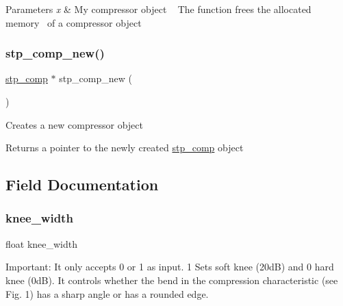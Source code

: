 \begin{DoxyParams}{Parameters}
{\em x} & My compressor object ~\newline
 The function frees the allocated memory~\newline
 of a compressor object \\
\hline
\end{DoxyParams}
\mbox{\label{structstp__comp_adcecb43a5505c7a62ff01747b89cba1c}} 
\subsubsection{\texorpdfstring{stp\+\_\+comp\+\_\+new()}{stp\_comp\_new()}}
{\footnotesize\ttfamily \mbox{\hyperlink{structstp__comp}{stp\+\_\+comp}} $\ast$ stp\+\_\+comp\+\_\+new (\begin{DoxyParamCaption}{ }\end{DoxyParamCaption})\hspace{0.3cm}{\ttfamily [related]}}



Creates a new compressor object~\newline
 

\begin{DoxyReturn}{Returns}
a pointer to the newly created \mbox{\hyperlink{structstp__comp}{stp\+\_\+comp}} object ~\newline
 
\end{DoxyReturn}


\subsection{Field Documentation}
\mbox{\label{structstp__comp_a177e7480fe81136c83715e274f5600d9}} 
\subsubsection{\texorpdfstring{knee\+\_\+width}{knee\_width}}
{\footnotesize\ttfamily float knee\+\_\+width}

Important\+: It only accepts 0 or 1 as input. 1 Sets soft knee (20dB) and 0 hard knee (0dB). It controls whether the bend in the compression characteristic (see Fig. 1) has a sharp angle or has a rounded edge. \mbox{\label{structstp__comp_a8471668a5e9d7dea04b4e891eb186edf}} 
